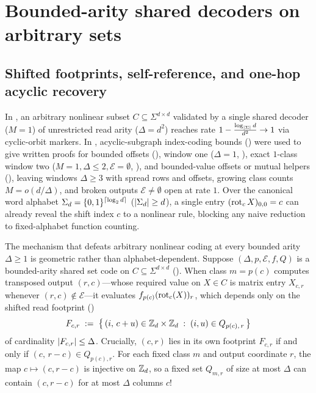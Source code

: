 \section{Bounded-arity shared decoders on arbitrary sets}\label{sec:capacity}

\subsection{Shifted footprints, self-reference, and one-hop acyclic recovery}\label{sec:capacity-mechanism}

In \cite[Appendix~A, Theorem~A.1 and Corollary~A.2]{SharedDecoders2026}, an arbitrary nonlinear
subset $C \subseteq \Sigma^{d\times d}$ validated by a single shared decoder ($M = 1$) of
unrestricted read arity ($\Delta = d^2$) reaches rate $1 - \frac{\log_{\lvert \Sigma \rvert} d}{d^2} \to 1$
via cyclic-orbit markers. In \cite[Section~6.7, Propositions~6.21--6.23, and
Problem~9.4(b)]{SeventeenthPaper2026}, acyclic-subgraph index-coding bounds
(\cite[Theorem~3]{BBJK2011}) were used to give written proofs for bounded offsets
(\cite[Proposition~6.21(a)]{SeventeenthPaper2026}), window one ($\Delta = 1$,
\cite[Proposition~6.21(b)]{SeventeenthPaper2026}), exact $1$-class window two
($M = 1, \Delta \le 2, \mathcal{E} = \emptyset$, \cite[Proposition~6.22(b)]{SeventeenthPaper2026}),
and bounded-value offsets or mutual helpers (\cite[Proposition~6.22(c)--(d) and
Proposition~6.23]{SeventeenthPaper2026}), leaving windows $\Delta \ge 3$ with spread rows and
offsets, growing class counts $M = o(d/\Delta)$, and broken outputs $\mathcal{E} \ne \emptyset$
open at rate $1$. Over the canonical word alphabet
$\Sigma_d = \{0,1\}^{\lceil \log_2 d \rceil}$ ($\lvert \Sigma_d \rvert \ge d$), a single entry $(\operatorname{rot}_c X)_{0,0} = c$ can
already reveal the shift index $c$ to a nonlinear rule, blocking any naive reduction to fixed-alphabet
function counting.

The mechanism that defeats arbitrary nonlinear coding at every bounded arity $\Delta \ge 1$ is
geometric rather than alphabet-dependent. Suppose $(\Delta, p, \mathcal{E}, f, Q)$ is a
bounded-arity shared set code on $C \subseteq \Sigma^{d\times d}$ ().
When class $m = p(c)$ computes transposed output $(r,c)$---whose required value on $X \in C$ is
matrix entry $X_{c,r}$ whenever $(r,c) \notin \mathcal{E}$---it evaluates $f_{p(c)}(\operatorname{rot}_c(X))_r$,
which depends only on the shifted read footprint ()
\[
  F_{c,r} \;:=\; \bigl\{\,(i,\, c + u) \in \mathbb{Z}_d \times \mathbb{Z}_d \;:\; (i, u) \in Q_{p(c),\,r}\,\bigr\}
\]
of cardinality $\lvert F_{c,r} \rvert \le \Delta$. Crucially, $(c,r)$ lies in its own footprint $F_{c,r}$
if and only if $(c,\, r - c) \in Q_{p(c),r}$. For each fixed class $m$ and output coordinate $r$,
the map $c \mapsto (c, r - c)$ is injective on $\mathbb{Z}_d$, so a fixed set $Q_{m,r}$ of size at most
$\Delta$ can contain $(c, r - c)$ for at most $\Delta$ columns $c$!

